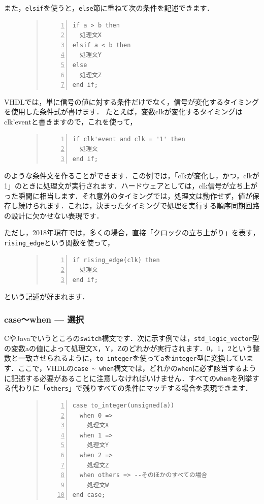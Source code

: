 \documentclass[a4paper,dvipdfmx]{jsarticle}
\begin{document}
また，\verb|elsif|を使うと，\verb|else|節に重ねて次の条件を記述できます．
\begin{figure}[H]
\begin{quote}
\begin{Verbatim}[frame=single, numbers=left, baselinestretch=0.8]
if a > b then
  処理文X
elsif a < b then
  処理文Y
else
  処理文Z
end if;
\end{Verbatim}
\end{quote}
\end{figure}

VHDLでは，単に信号の値に対する条件だけでなく，信号が変化するタイミングを使用した条件式が書けます．
たとえば，変数clkが変化するタイミングはclk'eventと書きますので，これを使って，
\begin{figure}[H]
\begin{quote}
\begin{Verbatim}[frame=single, numbers=left, baselinestretch=0.8]
if clk'event and clk = '1' then
  処理文
end if;
\end{Verbatim}
\end{quote}
\end{figure}
のような条件文を作ることができます．この例では，「clkが変化し，かつ，clkが1」のときに処理文が実行されます．ハードウェアとしては，clk信号が立ち上がった瞬間に相当します．それ意外のタイミングでは，処理文は動作せず，値が保存し続けられます．これは，決まったタイミングで処理を実行する順序同期回路の設計に欠かせない表現です．

ただし，2018年現在では，多くの場合，直接「クロックの立ち上がり」を表す，\verb|rising_edge|という関数を使って，
\begin{figure}[H]
\begin{quote}
\begin{Verbatim}[frame=single, numbers=left, baselinestretch=0.8]
if rising_edge(clk) then
  処理文
end if;
\end{Verbatim}
\end{quote}
\end{figure}
という記述が好まれます．

\subsubsection{case〜when --- 選択}
CやJavaでいうところの\verb|switch|構文です．次に示す例では，\verb|std_logic_vector|型の変数aの値によって処理文X，Y，Zのどれかが実行されます．0，1，2という整数と一致させられるように，\verb|to_integer|を使って\verb|a|を\verb|integer|型に変換しています．ここで，VHDLの\verb|case ~ when|構文では，どれかの\verb|when|に必ず該当するように記述する必要があることに注意しなければいけません．すべての\verb|when|を列挙する代わりに「\verb|others|」で残りすべての条件にマッチする場合を表現できます．
\begin{figure}[H]
\begin{quote}
\begin{Verbatim}[frame=single, numbers=left, baselinestretch=0.8]
case to_integer(unsigned(a))
  when 0 =>
    処理文X
  when 1 =>
    処理文Y
  when 2 =>
    処理文Z
  when others => --そのほかのすべての場合
    処理文W
end case;
\end{Verbatim}
\end{quote}
\end{figure}
\end{document}
